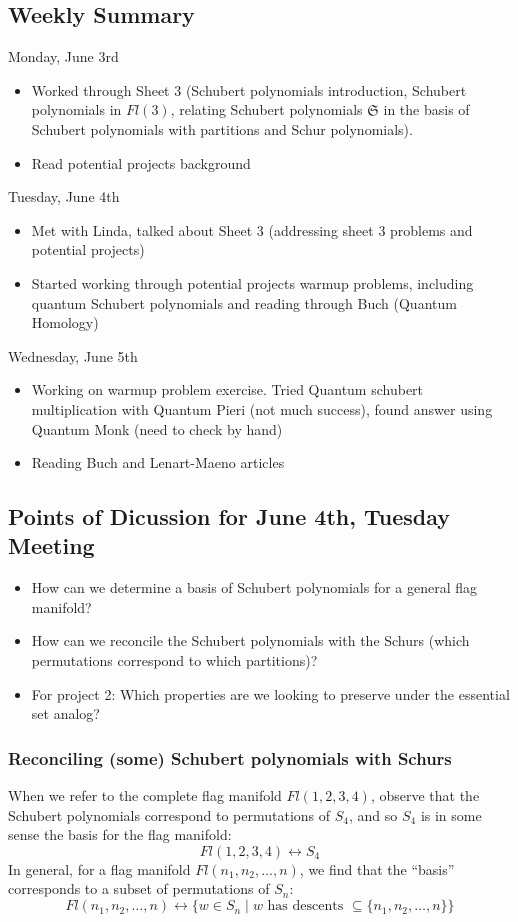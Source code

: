 \subsection{Weekly Summary}

Monday, June 3rd
\begin{itemize}
    \item Worked through Sheet 3 (Schubert polynomials introduction, Schubert polynomials in $Fl(3)$, relating Schubert polynomials $\mathfrak{S}$ in the basis of Schubert polynomials with partitions and Schur polynomials).
    \item Read potential projects background
\end{itemize}

Tuesday, June 4th
\begin{itemize}
    \item Met with Linda, talked about Sheet 3 (addressing sheet 3 problems and potential projects)
    \item Started working through potential projects warmup problems, including quantum Schubert polynomials and reading through Buch (Quantum Homology)
\end{itemize}

Wednesday, June 5th
\begin{itemize}
    \item Working on warmup problem exercise. Tried Quantum schubert multiplication with Quantum Pieri (not much success), found answer using Quantum Monk (need to check by hand)
    \item Reading Buch and Lenart-Maeno articles
\end{itemize}
\subsection{Points of Dicussion for June 4th, Tuesday Meeting}

\begin{itemize}
    \item How can we determine a basis of Schubert polynomials for a general flag manifold?
    \item How can we reconcile the Schubert polynomials with the Schurs (which permutations correspond to which partitions)?
    \item For project 2: Which properties are we looking to preserve under the essential set analog?
\end{itemize}

\subsubsection{Reconciling (some) Schubert polynomials with Schurs}
When we refer to the complete flag manifold $Fl(1, 2, 3, 4)$, observe that the Schubert polynomials correspond to permutations of $S_4$, and so $S_4$ is in some sense the basis for the flag manifold:
\[
    Fl(1, 2, 3, 4) \leftrightarrow S_4
\]
In general, for a flag manifold $Fl(n_1, n_2, \dots, n)$, we find that the ``basis'' corresponds to a subset of permutations of $S_n$:
\[
    Fl(n_1, n_2, \dots, n) \leftrightarrow \{ w \in S_n \mid w \text{ has descents } \subseteq \{ n_1, n_2, \dots, n\} \}
\]

